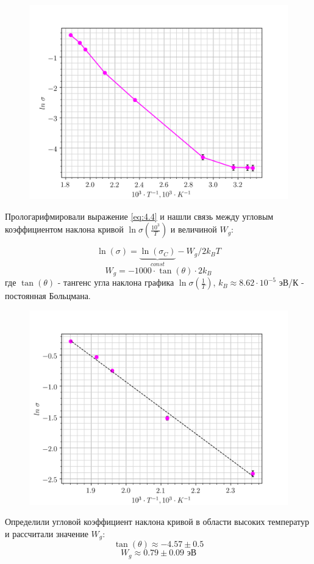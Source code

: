 \begin{figure}[h!]
	\centering
	\includegraphics[width = .8\linewidth]{graphs/lns1.png}
	\caption{}
	\label{fig:exp.1}
\end{figure}

Прологарифмировали выражение \eqref{eq:4.4} и нашли связь между угловым коэффициентом наклона кривой
$\ln\sigma(\frac{10^3}{T})$ и величиной $W_g$:

$$ \ln(\sigma) = \underbrace{\ln(\sigma_C)}_{const} - W_g /2 k_B T $$
$$ W_g = -1000 \cdot \tan(\theta) \cdot 2 k_B $$
где $\tan(\theta)$ - тангенс угла наклона графика $\ln\sigma(\frac{1}{T})$, $k_B \approx 8.62 \cdot 10^{-5}$ эВ/К -
постоянная Больцмана.

\begin{figure}[h!]
	\centering
	\includegraphics[width = .8\linewidth]{graphs/lns2.png}
	\caption{}
	\label{fig:exp.2}
\end{figure}

Определили угловой коэффициент наклона кривой в области высоких температур и рассчитали значение $W_g$:
$$\tan(\theta) \approx -4.57 \pm 0.5 $$
$$ W_g \approx 0.79 \pm 0.09\text{ эВ}$$ 


